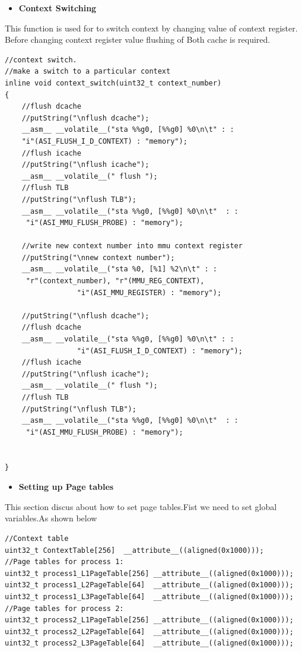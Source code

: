 \documentclass[12pt,a4paper]{article}
\begin{document}
\newpage
\begin{itemize}
\item \textbf{Context Switching}
\end{itemize}
This function is used for to switch context by changing value of context register. Before changing context register value flushing of Both cache is required.
\begin{lstlisting}
//context switch.
//make a switch to a particular context
inline void context_switch(uint32_t context_number)
{
	//flush dcache
	//putString("\nflush dcache");
	__asm__ __volatile__("sta %%g0, [%%g0] %0\n\t" : :
	"i"(ASI_FLUSH_I_D_CONTEXT) : "memory");
	//flush icache
	//putString("\nflush icache");
	__asm__ __volatile__(" flush ");
	//flush TLB
	//putString("\nflush TLB");
	__asm__ __volatile__("sta %%g0, [%%g0] %0\n\t"  : :
	 "i"(ASI_MMU_FLUSH_PROBE) : "memory");

	//write new context number into mmu context register
	//putString("\nnew context number");
	__asm__ __volatile__("sta %0, [%1] %2\n\t" : :
	 "r"(context_number), "r"(MMU_REG_CONTEXT),
			     "i"(ASI_MMU_REGISTER) : "memory");

	//putString("\nflush dcache");
	//flush dcache
	__asm__ __volatile__("sta %%g0, [%%g0] %0\n\t" : :
			     "i"(ASI_FLUSH_I_D_CONTEXT) : "memory");
	//flush icache
	//putString("\nflush icache");
	__asm__ __volatile__(" flush ");
	//flush TLB
	//putString("\nflush TLB");
	__asm__ __volatile__("sta %%g0, [%%g0] %0\n\t"  : :
	 "i"(ASI_MMU_FLUSH_PROBE) : "memory");


}
 \end{lstlisting}
\newpage
\begin{itemize}
\item \textbf{Setting up Page tables}
\end{itemize}
This section discus about how to set page tables.Fist we need to set global variables.As shown below
\begin{lstlisting}
//Context table
uint32_t ContextTable[256]  __attribute__((aligned(0x1000)));
//Page tables for process 1:
uint32_t process1_L1PageTable[256] __attribute__((aligned(0x1000)));
uint32_t process1_L2PageTable[64]  __attribute__((aligned(0x1000)));
uint32_t process1_L3PageTable[64]  __attribute__((aligned(0x1000)));
//Page tables for process 2:
uint32_t process2_L1PageTable[256] __attribute__((aligned(0x1000)));
uint32_t process2_L2PageTable[64]  __attribute__((aligned(0x1000)));
uint32_t process2_L3PageTable[64]  __attribute__((aligned(0x1000)));
 \end{lstlisting}
 
\end{document}
